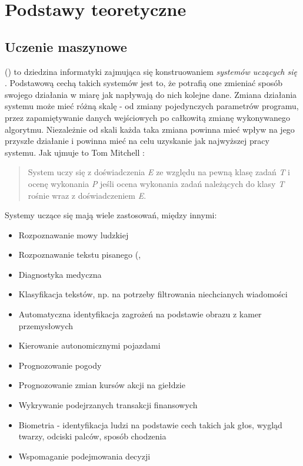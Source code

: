\chapter{Podstawy teoretyczne}

\section{Uczenie maszynowe}
 () to dziedzina informatyki zajmująca się konstruowaniem \textit{systemów uczących się} \cite{krawiec2003uczenie}. Podstawową cechą takich systemów jest to, że potrafią one zmieniać sposób swojego działania w miarę jak napływają do nich kolejne dane. Zmiana działania systemu może mieć różną skalę - od zmiany pojedynczych parametrów programu, przez zapamiętywanie danych wejściowych po całkowitą zmianę wykonywanego algorytmu. Niezależnie od skali każda taka zmiana powinna mieć wpływ na jego przyszłe działanie i powinna mieć na celu uzyskanie jak najwyższej  pracy systemu. Jak ujmuje to Tom Mitchell \cite{Mitchell:1997:ML:541177}:
\begin{quote}
System uczy się z doświadczenia \textit{E} ze względu na pewną klasę zadań \textit{T} i ocenę wykonania \textit{P} jeśli ocena wykonania zadań należących do klasy \textit{T} rośnie wraz z doświadczeniem \textit{E}.
\end{quote}



Systemy uczące się mają wiele zastosowań, między innymi:
\begin{itemize}
	\item Rozpoznawanie mowy ludzkiej
	\item Rozpoznawanie tekstu pisanego (, 
	\item Diagnostyka medyczna
	\item Klasyfikacja tekstów, np. na potrzeby filtrowania niechcianych wiadomości
	\item Automatyczna identyfikacja zagrożeń na podstawie obrazu z kamer przemysłowych
	\item Kierowanie autonomicznymi pojazdami
	\item Prognozowanie pogody
	\item Prognozowanie zmian kursów akcji na giełdzie
	\item Wykrywanie podejrzanych transakcji finansowych
	\item Biometria - identyfikacja ludzi na podstawie cech takich jak głos, wygląd twarzy, odciski palców, sposób chodzenia
	\item Wspomaganie podejmowania decyzji
\end{itemize}

